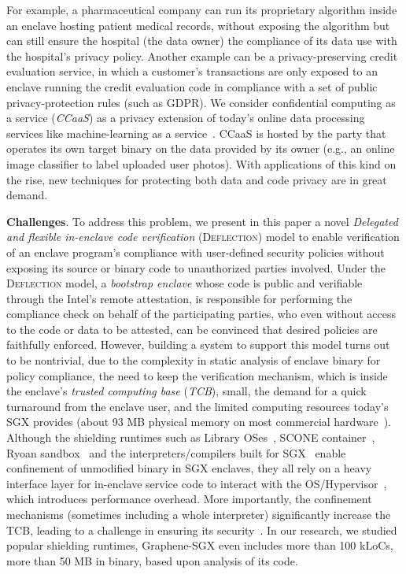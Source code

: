 For example, a  pharmaceutical company can run its proprietary algorithm inside an enclave hosting patient medical records, without exposing the algorithm but can still ensure the hospital (the data owner) the compliance of its data use with the hospital's privacy policy. Another example can be a privacy-preserving credit evaluation service, in which a customer's transactions are only exposed to an enclave running the credit evaluation code in compliance with a set of public privacy-protection rules (such as GDPR).
We consider confidential computing as a service (\textit{CCaaS}) as a privacy extension of today's online data processing services like machine-learning as a service~\cite{russinovich2017introducing}. CCaaS is hosted by the party that operates its own target binary on the data provided by its owner (e.g., an online image classifier to label uploaded user photos). With applications of this kind on the rise, new techniques for protecting both data and code privacy are in great demand.  

\vspace{3pt}\noindent\textbf{Challenges}. To address this problem, we present in this paper a novel \textit{Delegated and flexible in-enclave code verification} (\textsc{Deflection}) model to enable verification of an enclave program's compliance with user-defined security policies without exposing its source or binary code to unauthorized parties involved. Under the \textsc{Deflection} model, a \textit{bootstrap enclave} whose code is public and verifiable through the Intel's remote attestation, is responsible for performing the compliance check on behalf of the participating parties, who even without access to the code or data to be attested, can be convinced that desired policies are faithfully enforced.  
However, building a system to support this model turns out to be nontrivial, due to the complexity in static analysis of enclave binary for policy compliance, the need to keep the verification mechanism, which is inside the enclave's \textit{trusted computing base} (\textit{TCB}), small, the demand for a quick turnaround from the enclave user, and the limited computing resources today's SGX provides (about 93 MB physical memory on most commercial hardware~\cite{chakrabarti2019scaling}). 
Although the shielding runtimes such as Library OSes~\cite{priebe2019sgx,shen2020occlum},  SCONE container~\cite{arnautov2016scone}, Ryoan sandbox~\cite{hunt2018ryoan} and the interpreters/compilers built for SGX~\cite{wang2019towards,wang2019running} enable confinement of unmodified binary in SGX  enclaves, they all rely on a heavy interface layer for in-enclave service code to interact with the OS/Hypervisor~\cite{lazard2018teeshift}, which introduces performance overhead. More importantly, the confinement mechanisms (sometimes including a whole interpreter) significantly increase the TCB, leading to a challenge in ensuring its security~\cite{van2019tale}. In our research, we studied popular shielding runtimes, Graphene-SGX even includes more than 100 kLoCs, more than 50 MB in binary, based upon analysis of its code.

